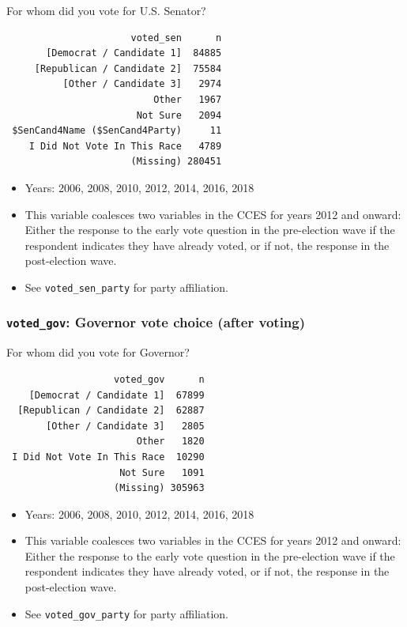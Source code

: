 \documentclass[10pt,article,oneside]{memoir}
\theoremstyle{definition}
\begin{document}
For whom did you vote for U.S. Senator?

\begin{verbatim}
                      voted_sen      n
       [Democrat / Candidate 1]  84885
     [Republican / Candidate 2]  75584
          [Other / Candidate 3]   2974
                          Other   1967
                       Not Sure   2094
 $SenCand4Name ($SenCand4Party)     11
    I Did Not Vote In This Race   4789
                      (Missing) 280451
\end{verbatim}

\begin{itemize}
\tightlist
\item
  Years: 2006, 2008, 2010, 2012, 2014, 2016, 2018
\item
  This variable coalesces two variables in the CCES for years 2012 and
  onward: Either the response to the early vote question in the
  pre-election wave if the respondent indicates they have already voted,
  or if not, the response in the post-election wave.
\item
  See \texttt{voted\_sen\_party} for party affiliation.
\end{itemize}

\subsubsection{\texorpdfstring{\texttt{voted\_gov}: Governor vote choice
(after
voting)}{voted\_gov: Governor vote choice (after voting)}}\label{voted_gov-governor-vote-choice-after-voting}

For whom did you vote for Governor?

\begin{verbatim}
                   voted_gov      n
    [Democrat / Candidate 1]  67899
  [Republican / Candidate 2]  62887
       [Other / Candidate 3]   2805
                       Other   1820
 I Did Not Vote In This Race  10290
                    Not Sure   1091
                   (Missing) 305963
\end{verbatim}

\begin{itemize}
\tightlist
\item
  Years: 2006, 2008, 2010, 2012, 2014, 2016, 2018
\item
  This variable coalesces two variables in the CCES for years 2012 and
  onward: Either the response to the early vote question in the
  pre-election wave if the respondent indicates they have already voted,
  or if not, the response in the post-election wave.
\item
  See \texttt{voted\_gov\_party} for party affiliation.
\end{itemize}
\end{document}
